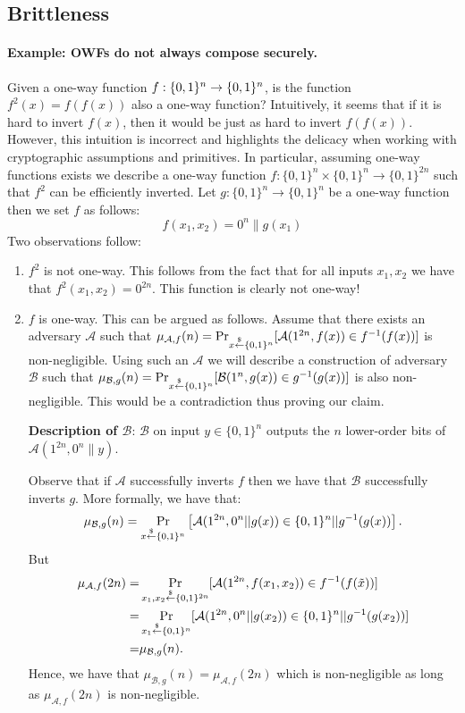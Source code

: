 \documentclass[12pt]{tufte-book}
\begin{document}
\subsection{Brittleness}
\paragraph{Example: OWFs do not always compose securely.}
Given a one-way function $f : \{0,1\}^{n}\rightarrow\{0,1\}^{n}$, is the function $f^2(x) = f(f(x))$ also a one-way function?  Intuitively, it seems that if it is hard to invert $f(x)$, then it would be just as hard to invert $f(f(x))$. 
However, this intuition is incorrect and highlights the delicacy when working with cryptographic assumptions and primitives. In particular, assuming one-way functions exists we describe a one-way function $f: \{0,1\}^{n}\times \{0,1\}^{n} \rightarrow \{0,1\}^{2n}$ such that $f^2$ can be efficiently inverted.
Let $g: \{0,1\}^n \rightarrow \{0,1\}^n$ be a one-way function then we set $f$ as follows:
$$f(x_1,x_2) = 0^{n}\|g(x_1)$$
Two observations follow:
\begin{enumerate} 
  \item $f^2$ is not one-way. This follows from the fact that for all inputs $x_1, x_2$ we have that $f^2(x_1,x_2) = 0^{2n}$. This function is clearly not one-way!
  \item $f$ is one-way. This can be argued as follows. Assume that there exists an adversary $\mathcal{A}$ such that $\mu_{\mathcal{A},f}(n) = \Pr_{x \stackrel{\$}{\leftarrow} \{0,1\}^{n}}[ \mathcal{A}(1^{2n}, f(x)) \in f^{-1}(f(x))]$ is non-negligible. Using such an $\mathcal{A}$ we will describe a construction of adversary $\mathcal{B}$ such that $\allowbreak\mu_{\mathcal{B},g}(n) = \Pr_{x \stackrel{\$}{\leftarrow} \{0,1\}^{n}}[ \mathcal{B}(1^n, g(x)) \in g^{-1}(g(x))]$ is also non-negligible. This would be a contradiction thus proving our claim.

      \textbf{Description of $\mathcal{B}$}: $\mathcal{B}$ on input $y \in\{0,1\}^n$ outputs the $n$ lower-order bits of  $\mathcal{A}(1^{2n}, 0^{n}\|y)$.

      Observe that if $\mathcal{A}$ successfully inverts $f$ then we have that $\mathcal{B}$ successfully inverts $g$. More formally, we have that:
      $$\mu_{\mathcal{B},g}(n) = \Pr_{x \stackrel{\$}{\leftarrow} \{0,1\}^{n}}\left[ \mathcal{A}(1^{2n}, 0^n || g(x)) \in \{0,1\}^n || g^{-1}(g(x))\right].$$
      But
      \begin{align*}
      \mu_{\mathcal{A},f}(2n) =& \Pr_{x_1, x_2 \stackrel{\$}{\leftarrow} \{0,1\}^{2n}}[ \mathcal{A}(1^{2n}, f(x_1, x_2)) \in f^{-1}(f(\tilde x))]\\
      = & \Pr_{x_1 \stackrel{\$}{\leftarrow} \{0,1\}^{n}}[ \mathcal{A}(1^{2n}, 0^n || g(x_2)) \in \{0,1\}^n || g^{-1}(g(x_2))] \\
      = & \mu_{\mathcal{B},g}(n).
      \end{align*}
      Hence, we have that $\mu_{\mathcal{B},g}(n) = \mu_{\mathcal{A},f}(2n)$ which is non-negligible as long as $\mu_{\mathcal{A},f}(2n)$  is non-negligible.
\end{enumerate}
\end{document}
